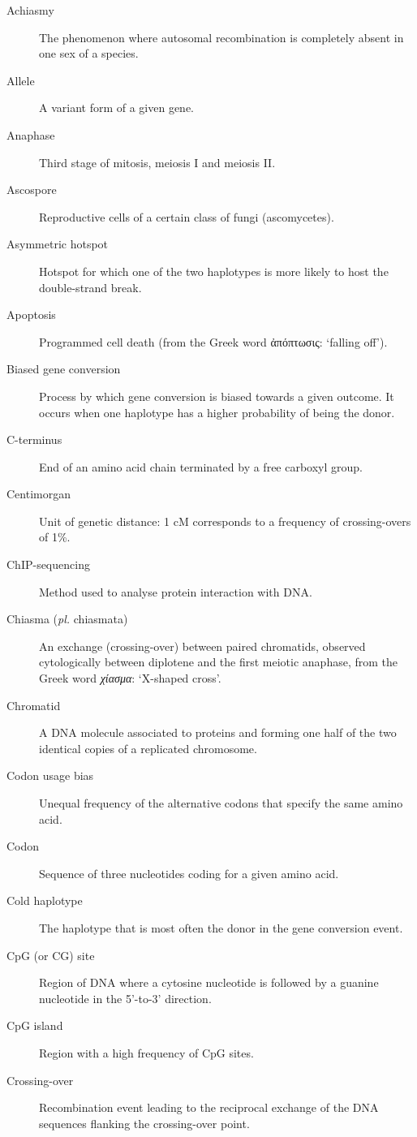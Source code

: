 \begin{alwayssingle}
\begin{description}
		\item[Achiasmy] The phenomenon where autosomal recombination is completely absent in one sex of a species.
		\item[Allele] A variant form of a given gene.
		\item[Anaphase] Third stage of mitosis, meiosis I and meiosis II\@.
		\item[Ascospore] Reproductive cells of a certain class of fungi (ascomycetes).
		\item[Asymmetric hotspot] Hotspot for which one of the two haplotypes is more likely to host the double-strand break.
		\item[Apoptosis] Programmed cell death (from the Greek word \textgreek{ἀπόπτωσις}: ‘falling off’).
		\item[Biased gene conversion] Process by which gene conversion is biased towards a given outcome. It occurs when one haplotype has a higher probability of being the donor.
		\item[C-terminus] End of an amino acid chain terminated by a free carboxyl group.
		\item[Centimorgan] Unit of genetic distance: 1 cM corresponds to a frequency of crossing-overs of 1\%.
		\item[ChIP-sequencing] Method used to analyse protein interaction with DNA\@.
		\item[Chiasma (\textit{pl.} chiasmata)] An exchange (crossing-over) between paired chromatids, observed cytologically between diplotene and the first meiotic anaphase, from the Greek word \textit{\textgreek{χίασμα}}: ‘X-shaped cross’.%
		\item[Chromatid] A DNA molecule associated to proteins and forming one half of the two identical copies of a replicated chromosome.
		\item[Codon usage bias] Unequal frequency of the alternative codons that specify the same amino acid.
		\item[Codon] Sequence of three nucleotides coding for a given amino acid.
		\item[Cold haplotype] The haplotype that is most often the donor in the gene conversion event.
		\item[CpG (or CG) site] Region of DNA where a cytosine nucleotide is followed by a guanine nucleotide in the 5’-to-3’ direction.
		\item[CpG island] Region with a high frequency of CpG sites.
		\item[Crossing-over] Recombination event leading to the reciprocal exchange of the DNA sequences flanking the crossing-over point.

\end{description}
\end{alwayssingle}
